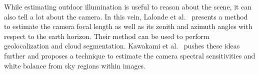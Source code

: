 While estimating outdoor illumination is useful to reason about the scene, it can also tell a lot about the camera. In this vein, Lalonde et al.~\cite{lalonde-ijcv-10} presents a method to estimate the camera focal length as well as its zenith and azimuth angles with respect to the earth horizon. Their method can be used to perform geolocalization and cloud segmentation. Kawakami et al.~\cite{kawakami2013camera} pushes these ideas further and proposes a technique to estimate the camera spectral sensitivities and white balance from sky regions within images. 




